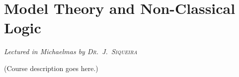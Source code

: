 \chapter[Model Theory and Non-Classical Logic \\ \textnormal{\emph{Lectured in Michaelmas \oldstylenums{2023} by \textsc{Dr.\ J.\ Siqueira}}}]{Model Theory and Non-Classical Logic}
\emph{\Large Lectured in Michaelmas  by \textsc{Dr.\ J.\ Siqueira}}

(Course description goes here.)


